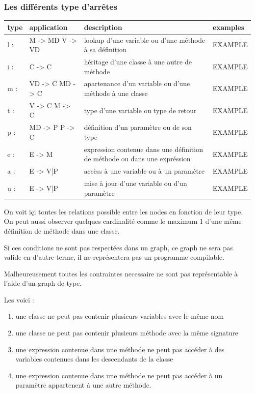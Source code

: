 \documentclass[a4paper, 10pt]{article}
\begin{document}
\subsubsection{Les différents type d'arrêtes}

  \begin{tabular}{ | l | l |  l | l |}
    \hline type & application & description & examples \\ \hline
    l : & M -> MD  V -> VD &  lookup d'une variable ou d'une méthode à sa définition & EXAMPLE \\ \hline 
    i : & C -> C &  héritage d'une classe à une autre de méthode & EXAMPLE   \\ \hline
    m : & VD -> C  MD -> C &   apartenance d'un variable ou d'une méthode à une classe & EXAMPLE   \\ \hline
    t : & V -> C  M -> C &   type d'une variable ou type de retour & EXAMPLE   \\ \hline
    p : & MD -> P  P -> C &   définition d'un paramètre ou de son type  & EXAMPLE   \\ \hline
    e : & E -> M & expression contenue dans une définition de méthode ou dans une expréssion & EXAMPLE   \\ \hline
    a : & E -> {V|P} & accèss à une variable ou à un paramètre & EXAMPLE   \\ \hline
    u : & E -> {V|P} & mise à jour d'une variable ou d'un paramètre & EXAMPLE   \\ \hline
   \end{tabular}

On voit içi toutes les relations possible entre les nodes en fonction de leur type.
On peut aussi observer quelques cardinalité comme le maximum 1 d'une même définition de méthode dans une classe.

Si ces conditions ne sont pas respectées dans un graph, ce graph ne sera pas valide en d'autre terme, il ne représentera pas un programme compilable.

Malheureusement toutes les contraintes necessaire ne sont pas représentable à l'aide d'un graph de type.

Les voici :

\begin{enumerate}
\item une classe ne peut pas contenir plusieurs variables avec le même nom
\item une classe ne peut pas contenir plusieurs méthode avec la même signature
\item une expression contenue dans une méthode ne peut pas accéder à des variables contenues dans les descendants de la classe
\item une expression contenue dans une méthode ne peut pas accéder à un paramètre appartenent à une autre méthode.
\end{enumerate}
\end{document}

